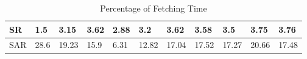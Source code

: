 \begin{table}[h!]
\begin{tabular}{|l|l|l|l|l|l|l|l|l|l|l|}
\scriptsize  {SR}
& \scriptsize  {1.5}
& \scriptsize {3.15}
& \scriptsize {3.62}
& \scriptsize {2.88}
& \scriptsize {3.2}
& \scriptsize {3.62}
& \scriptsize {3.58}
& \scriptsize {3.5}
& \scriptsize {3.75}
& \scriptsize {3.76}
\\ \hline



\scriptsize  {SAR}
& \scriptsize  {28.6}
& \scriptsize {19.23}
& \scriptsize {15.9}
& \scriptsize {6.31}
& \scriptsize {12.82}
& \scriptsize {17.04}
& \scriptsize {17.52}
& \scriptsize {17.27}
& \scriptsize {20.66}
& \scriptsize {17.48}
\\ \hline
\end{tabular}

\caption{Percentage of Fetching Time}\end{table}

